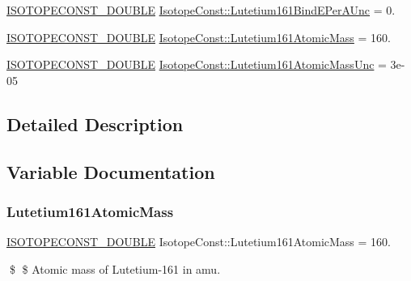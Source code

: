 \begin{DoxyCompactItemize}
\mbox{\hyperlink{group___isotope_const-_macros_ga8f45a7272ce02c0b4c65c44636ed719a}{I\+S\+O\+T\+O\+P\+E\+C\+O\+N\+S\+T\+\_\+\+D\+O\+U\+B\+LE}} \mbox{\hyperlink{group___isotope_const-_lutetium-_lu161_ga642e77172ed0017f2ded52abcbb1cc3b}{Isotope\+Const\+::\+Lutetium161\+Bind\+E\+Per\+A\+Unc}} = 0.
\item 
\mbox{\hyperlink{group___isotope_const-_macros_ga8f45a7272ce02c0b4c65c44636ed719a}{I\+S\+O\+T\+O\+P\+E\+C\+O\+N\+S\+T\+\_\+\+D\+O\+U\+B\+LE}} \mbox{\hyperlink{group___isotope_const-_lutetium-_lu161_ga5d975d8686fb1fda4dc933f7a91bd852}{Isotope\+Const\+::\+Lutetium161\+Atomic\+Mass}} = 160.
\item 
\mbox{\hyperlink{group___isotope_const-_macros_ga8f45a7272ce02c0b4c65c44636ed719a}{I\+S\+O\+T\+O\+P\+E\+C\+O\+N\+S\+T\+\_\+\+D\+O\+U\+B\+LE}} \mbox{\hyperlink{group___isotope_const-_lutetium-_lu161_gaf50dc0b267e6d44427b4d17b66ce38f4}{Isotope\+Const\+::\+Lutetium161\+Atomic\+Mass\+Unc}} = 3e-\/05
\end{DoxyCompactItemize}


\subsection{Detailed Description}


\subsection{Variable Documentation}
\mbox{\label{group___isotope_const-_lutetium-_lu161_ga5d975d8686fb1fda4dc933f7a91bd852}} 
\subsubsection{\texorpdfstring{Lutetium161\+Atomic\+Mass}{Lutetium161AtomicMass}}
{\footnotesize\ttfamily \mbox{\hyperlink{group___isotope_const-_macros_ga8f45a7272ce02c0b4c65c44636ed719a}{I\+S\+O\+T\+O\+P\+E\+C\+O\+N\+S\+T\+\_\+\+D\+O\+U\+B\+LE}} Isotope\+Const\+::\+Lutetium161\+Atomic\+Mass = 160.}

\$ \$ Atomic mass of Lutetium-\/161 in amu. \mbox{\label{group___isotope_const-_lutetium-_lu161_gaf50dc0b267e6d44427b4d17b66ce38f4}} 
